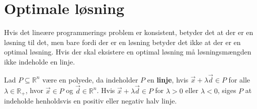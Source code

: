 \section{Optimale løsning}
\label{sec:eksistens}
Hvis det lineære programmerings problem er konsistent, betyder det at der er en løsning til det, men bare fordi der er en løsning betyder det ikke at der er en optimal løsning.
Hvis der skal eksistere en optimal løsning må løsningsmængden ikke indeholde en linje.
\begin{defn}[Linje]
Lad $P\subseteq \mathds{R}^n $ være en polyede, da indeholder $P$ en \textbf{linje}, hvis $\vec{x}+\lambda\vec{d} \in P$ for alle $\lambda \in \mathds{R}_+$, hvor $\vec{x}\in P$ og $\vec{d} \in \mathds{R}^n$. Hvis $\vec{x}+\lambda\vec{d} \in P$ for $\lambda > 0$ eller $\lambda < 0$, siges $P$ at indeholde henholdsvis en positiv eller negativ halv linje.
\label{def:linje}
\end{defn}

